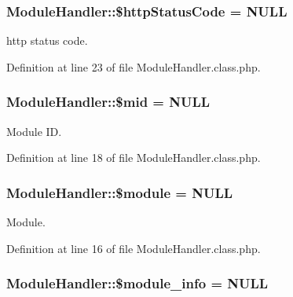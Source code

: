 \hypertarget{classModuleHandler_a033e864206ca6a6494af015baa5d2365}{
\subsubsection[{\$http\-Status\-Code}]{\setlength{\rightskip}{0pt plus 5cm}Module\-Handler\-::\$http\-Status\-Code = N\-U\-L\-L}}\label{classModuleHandler_a033e864206ca6a6494af015baa5d2365}


http status code. 



Definition at line 23 of file Module\-Handler.\-class.\-php.

\hypertarget{classModuleHandler_a6bb7e9e29c0fb9893d051179281b093e}{
\subsubsection[{\$mid}]{\setlength{\rightskip}{0pt plus 5cm}Module\-Handler\-::\$mid = N\-U\-L\-L}}\label{classModuleHandler_a6bb7e9e29c0fb9893d051179281b093e}


Module I\-D. 



Definition at line 18 of file Module\-Handler.\-class.\-php.

\hypertarget{classModuleHandler_a24f28ac6c101582f043bef672a9f3b00}{
\subsubsection[{\$module}]{\setlength{\rightskip}{0pt plus 5cm}Module\-Handler\-::\$module = N\-U\-L\-L}}\label{classModuleHandler_a24f28ac6c101582f043bef672a9f3b00}


Module. 



Definition at line 16 of file Module\-Handler.\-class.\-php.

\hypertarget{classModuleHandler_a2388e5ef665a5a82efa00c8c894df33c}{
\subsubsection[{\$module\-\_\-info}]{\setlength{\rightskip}{0pt plus 5cm}Module\-Handler\-::\$module\-\_\-info = N\-U\-L\-L}}\label{classModuleHandler_a2388e5ef665a5a82efa00c8c894df33c}


